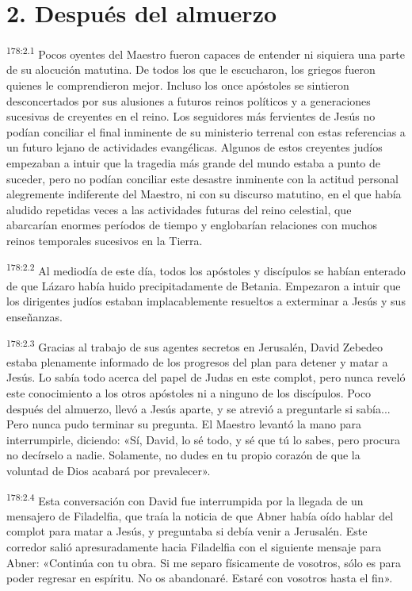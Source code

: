 \section*{2. Después del almuerzo}
\par 
\textsuperscript{178:2.1} Pocos oyentes del Maestro fueron capaces de entender ni siquiera una parte de su alocución matutina. De todos los que le escucharon, los griegos fueron quienes le comprendieron mejor. Incluso los once apóstoles se sintieron desconcertados por sus alusiones a futuros reinos políticos y a generaciones sucesivas de creyentes en el reino. Los seguidores más fervientes de Jesús no podían conciliar el final inminente de su ministerio terrenal con estas referencias a un futuro lejano de actividades evangélicas. Algunos de estos creyentes judíos empezaban a intuir que la tragedia más grande del mundo estaba a punto de suceder, pero no podían conciliar este desastre inminente con la actitud personal alegremente indiferente del Maestro, ni con su discurso matutino, en el que había aludido repetidas veces a las actividades futuras del reino celestial, que abarcarían enormes períodos de tiempo y englobarían relaciones con muchos reinos temporales sucesivos en la Tierra.

\par 
\textsuperscript{178:2.2} Al mediodía de este día, todos los apóstoles y discípulos se habían enterado de que Lázaro había huido precipitadamente de Betania. Empezaron a intuir que los dirigentes judíos estaban implacablemente resueltos a exterminar a Jesús y sus enseñanzas.

\par 
\textsuperscript{178:2.3} Gracias al trabajo de sus agentes secretos en Jerusalén, David Zebedeo estaba plenamente informado de los progresos del plan para detener y matar a Jesús. Lo sabía todo acerca del papel de Judas en este complot, pero nunca reveló este conocimiento a los otros apóstoles ni a ninguno de los discípulos. Poco después del almuerzo, llevó a Jesús aparte, y se atrevió a preguntarle si sabía... Pero nunca pudo terminar su pregunta. El Maestro levantó la mano para interrumpirle, diciendo: «Sí, David, lo sé todo, y sé que tú lo sabes, pero procura no decírselo a nadie. Solamente, no dudes en tu propio corazón de que la voluntad de Dios acabará por prevalecer».

\par 
\textsuperscript{178:2.4} Esta conversación con David fue interrumpida por la llegada de un mensajero de Filadelfia, que traía la noticia de que Abner había oído hablar del complot para matar a Jesús, y preguntaba si debía venir a Jerusalén. Este corredor salió apresuradamente hacia Filadelfia con el siguiente mensaje para Abner: «Continúa con tu obra. Si me separo físicamente de vosotros, sólo es para poder regresar en espíritu. No os abandonaré. Estaré con vosotros hasta el fin».

